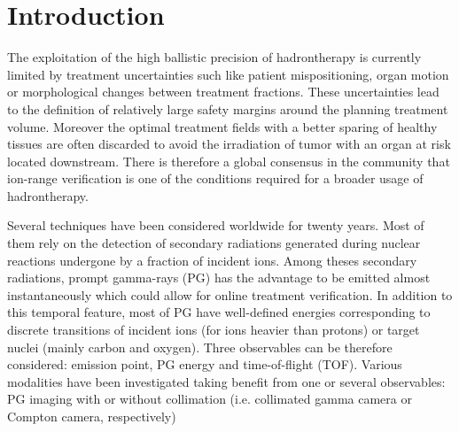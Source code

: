 \section{Introduction}

The exploitation of the high ballistic precision of hadrontherapy is currently limited by treatment uncertainties such like patient mispositioning, organ motion or morphological  changes between treatment fractions. These uncertainties lead to the definition of relatively large safety margins around the planning treatment volume. Moreover the optimal treatment fields with a better sparing of healthy tissues are often discarded to avoid the irradiation of tumor with an organ at risk located downstream. There is therefore a global consensus in the community that ion-range verification is one of the conditions required for a broader usage of hadrontherapy. 

Several techniques have been considered worldwide for twenty years. Most of them rely on the detection of secondary radiations generated during nuclear reactions undergone by a fraction of incident ions. Among theses secondary radiations, prompt gamma-rays (PG) has the advantage to be emitted almost instantaneously which could allow for online treatment verification. In addition to this temporal feature, most of PG have well-defined energies corresponding to discrete transitions of incident ions (for ions heavier than protons) or target nuclei (mainly carbon and oxygen). Three observables can be therefore considered: emission point, PG energy and time-of-flight (TOF). Various modalities have been investigated taking benefit from one or several observables: PG imaging with or without collimation (i.e. collimated gamma camera or Compton camera, respectively)
